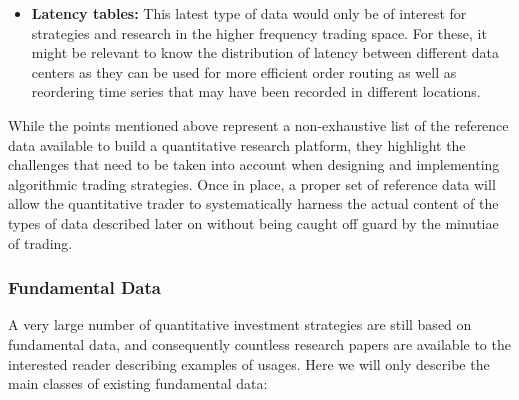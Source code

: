 \begin{itemize}
\item \textbf{Latency tables:} This latest type of data would only be of interest for strategies and research in the higher frequency trading space. For these, it might be relevant to know the distribution of latency between different data centers as they can be used for more efficient order routing as well as reordering time series that may have been recorded in different locations.

\end{itemize}

While the points mentioned above represent a non-exhaustive list of the reference data available to build a quantitative research platform, they highlight the challenges that need to be taken into account when designing and implementing algorithmic trading strategies. Once in place, a proper set of reference data will allow the quantitative trader to systematically harness the actual content of the types of data described later on without being caught off guard by the minutiae of trading.

\subsubsection{Fundamental Data}

A very large number of quantitative investment strategies are still based on fundamental data, and consequently countless research papers are available to the interested reader describing examples of usages. Here we will only describe the main classes of existing fundamental data:

